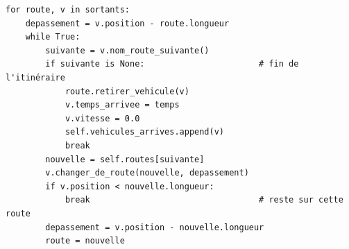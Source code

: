 \documentclass[12pt,a4paper]{report}
\begin{document}
\begin{lstlisting}[caption={Correction de S5 : passage de plusieurs routes en un seul pas}]
for route, v in sortants:
    depassement = v.position - route.longueur
    while True:
        suivante = v.nom_route_suivante()
        if suivante is None:                       # fin de l'itinéraire
            route.retirer_vehicule(v)
            v.temps_arrivee = temps
            v.vitesse = 0.0
            self.vehicules_arrives.append(v)
            break
        nouvelle = self.routes[suivante]
        v.changer_de_route(nouvelle, depassement)
        if v.position < nouvelle.longueur:
            break                                  # reste sur cette route
        depassement = v.position - nouvelle.longueur
        route = nouvelle
\end{lstlisting}
\end{document}
